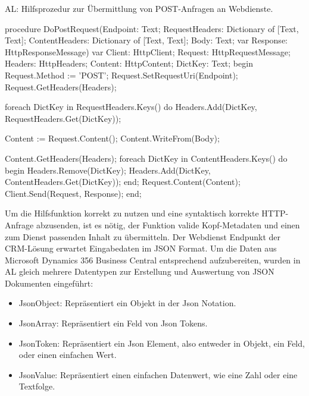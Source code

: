 \begin{program}  %
	\centering
	\caption{AL: Hilfsprozedur zur Übermittlung von POST-Anfragen an Webdienste.}
	\label{prog:wsHelper}
	
	\begin{JavaCode}
procedure DoPostRequest(Endpoint: Text;
                        RequestHeaders: Dictionary of [Text, Text];
                        ContentHeaders: Dictionary of [Text, Text];
                        Body: Text;
                        var Response: HttpResponseMessage)
var
  Client: HttpClient;
  Request: HttpRequestMessage;
  Headers: HttpHeaders;
  Content: HttpContent;
  DictKey: Text;
begin
  Request.Method := 'POST';
  Request.SetRequestUri(Endpoint);
  Request.GetHeaders(Headers);

  foreach DictKey in RequestHeaders.Keys() do
    Headers.Add(DictKey, RequestHeaders.Get(DictKey));

  Content := Request.Content();
  Content.WriteFrom(Body);

  Content.GetHeaders(Headers);
  foreach DictKey in ContentHeaders.Keys() do begin
    Headers.Remove(DictKey);
    Headers.Add(DictKey, ContentHeaders.Get(DictKey));
  end;
  Request.Content(Content);
  Client.Send(Request, Response);
end;
	\end{JavaCode}
\end{program}
\pagebreak

Um die Hilfsfunktion korrekt zu nutzen und eine syntaktisch korrekte HTTP-Anfrage abzusenden, ist es nötig, der Funktion valide Kopf-Metadaten und einen zum Dienst passenden Inhalt zu übermitteln. Der Webdienst Endpunkt der CRM-Lösung erwartet Eingabedaten im JSON Format. Um die Daten aus Microsoft Dynamics 356 Business Central entsprechend aufzubereiten, wurden in AL gleich mehrere Datentypen zur Erstellung und Auswertung von JSON Dokumenten eingeführt: 
\begin{itemize}
	\item JsonObject: Repräsentiert ein Objekt in der Json Notation.
	\item JsonArray: Repräsentiert ein Feld von Json Tokens.
	\item JsonToken: Repräsentiert ein Json Element, also entweder in Objekt, ein Feld, oder einen einfachen Wert.
	\item JsonValue: Repräsentiert einen einfachen Datenwert, wie eine Zahl oder eine Textfolge.
\end{itemize}
